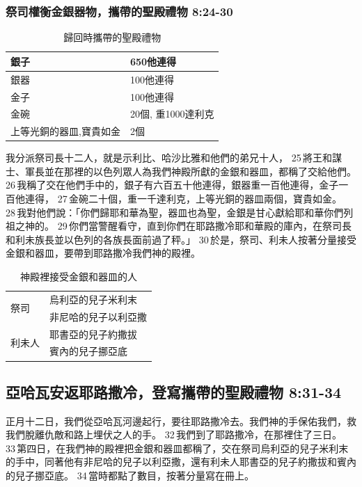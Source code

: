 \subsubsection{祭司權衡金銀器物，攜帶的聖殿禮物 8:24-30}
\begin{table}[H]
\centering 
\begin{tabular}{|p{4.5cm}|p{3.5cm}|}
\hline
\hline
銀子&650他連得\\\hline
銀器&100他連得 \\\hline
金子&100他連得\\\hline
金碗&20個, 重1000達利克\\\hline
上等光銅的器皿,寶貴如金&2個\\\hline
\end{tabular}
\caption{歸回時攜帶的聖殿禮物}
\end{table}
我分派祭司長十二人，就是示利比、哈沙比雅和他們的弟兄十人， 25 將王和謀士、軍長並在那裡的以色列眾人為我們神殿所獻的金銀和器皿，都稱了交給他們。 26 我稱了交在他們手中的，銀子有六百五十他連得，銀器重一百他連得，金子一百他連得， 27 金碗二十個，重一千達利克，上等光銅的器皿兩個，寶貴如金。 28 我對他們說：「你們歸耶和華為聖，器皿也為聖，金銀是甘心獻給耶和華你們列祖之神的。 29 你們當警醒看守，直到你們在耶路撒冷耶和華殿的庫內，在祭司長和利未族長並以色列的各族長面前過了秤。」 30 於是，祭司、利未人按著分量接受金銀和器皿，要帶到耶路撒冷我們神的殿裡。

\begin{table}[H]
\centering 
\begin{tabular}{|p{2cm}|p{5cm}|}
\hline
\hline
\multirow{2}{6em}{祭司} &烏利亞的兒子米利末\\
                         & 非尼哈的兒子以利亞撒\\\hline
\multirow{2}{6em}{利未人}&耶書亞的兒子約撒拔\\
                         &賓內的兒子挪亞底 \\\hline
\end{tabular}
\caption{神殿裡接受金銀和器皿的人}
\end{table}

\subsection{亞哈瓦安返耶路撒冷，登寫攜帶的聖殿禮物 8:31-34}
正月十二日，我們從亞哈瓦河邊起行，要往耶路撒冷去。我們神的手保佑我們，救我們脫離仇敵和路上埋伏之人的手。 32 我們到了耶路撒冷，在那裡住了三日。 33 第四日，在我們神的殿裡把金銀和器皿都稱了，交在祭司烏利亞的兒子米利末的手中，同著他有非尼哈的兒子以利亞撒，還有利未人耶書亞的兒子約撒拔和賓內的兒子挪亞底。 34 當時都點了數目，按著分量寫在冊上。

